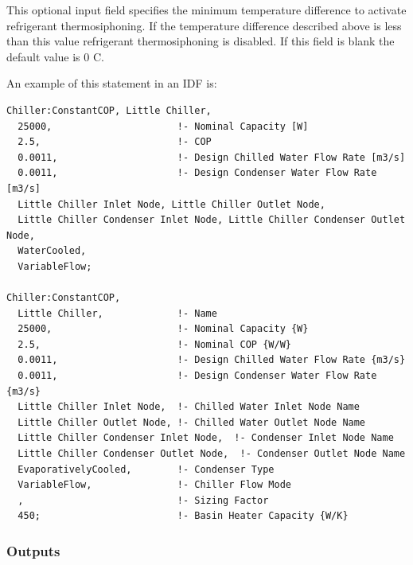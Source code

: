 This optional input field specifies the minimum temperature difference to activate refrigerant thermosiphoning. If the temperature difference described above is less than this value refrigerant thermosiphoning is disabled. If this field is blank the default value is 0 C.

An example of this statement in an IDF is:

\begin{lstlisting}
Chiller:ConstantCOP, Little Chiller,
  25000,                      !- Nominal Capacity [W]
  2.5,                        !- COP
  0.0011,                     !- Design Chilled Water Flow Rate [m3/s]
  0.0011,                     !- Design Condenser Water Flow Rate [m3/s]
  Little Chiller Inlet Node, Little Chiller Outlet Node,
  Little Chiller Condenser Inlet Node, Little Chiller Condenser Outlet Node,
  WaterCooled,
  VariableFlow;

Chiller:ConstantCOP,
  Little Chiller,             !- Name
  25000,                      !- Nominal Capacity {W}
  2.5,                        !- Nominal COP {W/W}
  0.0011,                     !- Design Chilled Water Flow Rate {m3/s}
  0.0011,                     !- Design Condenser Water Flow Rate {m3/s}
  Little Chiller Inlet Node,  !- Chilled Water Inlet Node Name
  Little Chiller Outlet Node, !- Chilled Water Outlet Node Name
  Little Chiller Condenser Inlet Node,  !- Condenser Inlet Node Name
  Little Chiller Condenser Outlet Node,  !- Condenser Outlet Node Name
  EvaporativelyCooled,        !- Condenser Type
  VariableFlow,               !- Chiller Flow Mode
  ,                           !- Sizing Factor
  450;                        !- Basin Heater Capacity {W/K}
\end{lstlisting}

\subsubsection{Outputs}\label{outputs-2-015}

